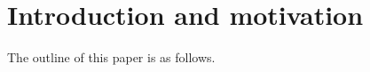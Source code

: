 \section{Introduction and motivation}
\label{sec:introduction}


The outline of this paper is as follows.
%
